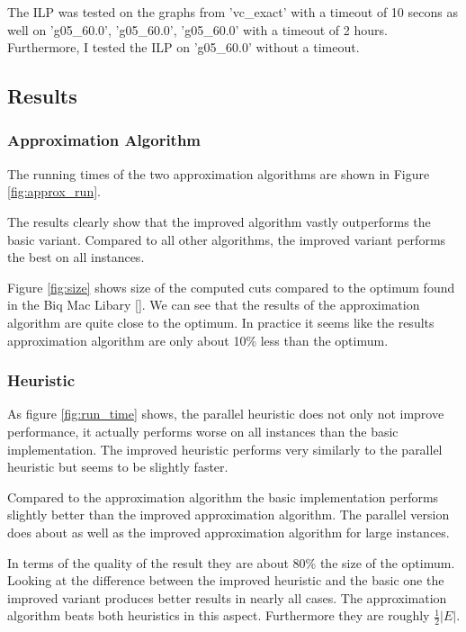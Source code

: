 \documentclass[twocolumn]{article}
\begin{document}
The ILP was tested on the graphs from 'vc\_exact' with a timeout of 10 secons as well on
'g05\_60.0', 'g05\_60.0', 'g05\_60.0' with a timeout of 2 hours.
Furthermore, I tested the ILP on 'g05\_60.0' without a timeout.


\subsection{Results}%
\label{sub:Results}

\subsubsection{Approximation Algorithm}
The running times of the two approximation algorithms are shown in Figure \ref{fig:approx_run}.

The results clearly show that the improved algorithm vastly outperforms the basic variant.
Compared to all other algorithms, the improved variant performs the best on all instances.

Figure \ref{fig:size} shows size of the computed cuts compared to the optimum found in the Biq Mac Libary [\cite{biq_mac}].
We can see that the results of the approximation algorithm are quite close to the optimum.
In practice it seems like the results approximation algorithm are only about 10\% less than the optimum.

\subsubsection{Heuristic}
As figure \ref{fig:run_time} shows, the parallel heuristic does not only not improve performance,
it actually performs worse on all instances than the basic implementation.
The improved heuristic performs very similarly to the parallel heuristic but seems to be slightly
faster.

Compared to the approximation algorithm the basic implementation performs slightly better
than the improved approximation algorithm.
The parallel version does about as well as the improved approximation algorithm for large
instances.

In terms of the quality of the result they are about 80\% the size of the optimum.
Looking at the difference between the improved heuristic and the basic one
the improved variant produces better results in nearly all cases.
The approximation algorithm beats both heuristics in this aspect.
Furthermore they are roughly $\frac{1}{2}|E|$.
\end{document}
